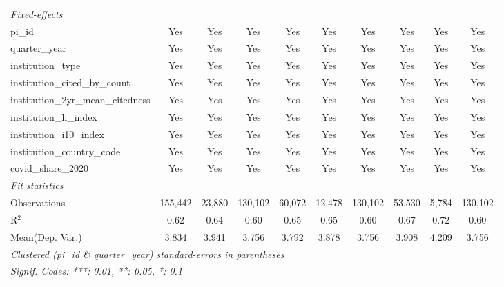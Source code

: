 \begin{tabular}{lccccccccc}
   \midrule
   \emph{Fixed-effects}\\
   pi\_id                                                      & Yes           & Yes           & Yes           & Yes           & Yes            & Yes           & Yes           & Yes           & Yes\\  
   quarter\_year                                               & Yes           & Yes           & Yes           & Yes           & Yes            & Yes           & Yes           & Yes           & Yes\\  
   institution\_type                                           & Yes           & Yes           & Yes           & Yes           & Yes            & Yes           & Yes           & Yes           & Yes\\  
   institution\_cited\_by\_count                               & Yes           & Yes           & Yes           & Yes           & Yes            & Yes           & Yes           & Yes           & Yes\\  
   institution\_2yr\_mean\_citedness                           & Yes           & Yes           & Yes           & Yes           & Yes            & Yes           & Yes           & Yes           & Yes\\  
   institution\_h\_index                                       & Yes           & Yes           & Yes           & Yes           & Yes            & Yes           & Yes           & Yes           & Yes\\  
   institution\_i10\_index                                     & Yes           & Yes           & Yes           & Yes           & Yes            & Yes           & Yes           & Yes           & Yes\\  
   institution\_country\_code                                  & Yes           & Yes           & Yes           & Yes           & Yes            & Yes           & Yes           & Yes           & Yes\\  
   covid\_share\_2020                                          & Yes           & Yes           & Yes           & Yes           & Yes            & Yes           & Yes           & Yes           & Yes\\  
   \midrule
   \emph{Fit statistics}\\
   Observations                                                & 155,442       & 23,880        & 130,102       & 60,072        & 12,478         & 130,102       & 53,530        & 5,784         & 130,102\\  
   R$^2$                                                       & 0.62          & 0.64          & 0.60          & 0.65          & 0.65           & 0.60          & 0.67          & 0.72          & 0.60\\  
Mean(Dep. Var.) & 3.834 & 3.941 & 3.756 & 3.792 & 3.878 & 3.756 & 3.908 & 4.209 & 3.756 \\
   \midrule \midrule
   \multicolumn{10}{l}{\emph{Clustered (pi\_id \& quarter\_year) standard-errors in parentheses}}\\
   \multicolumn{10}{l}{\emph{Signif. Codes: ***: 0.01, **: 0.05, *: 0.1}}\\
\end{tabular}
\par\endgroup
